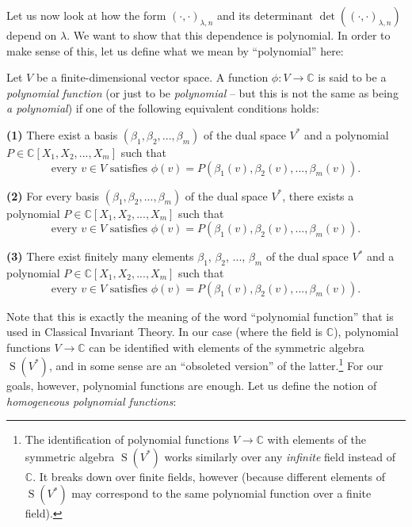 \documentclass[etingof-lie.tex]{subfiles}
\begin{document}
Let us now look at how the form $\left(  \cdot,\cdot\right)  _{\lambda,n}$ and
its determinant $\det\left(  \left(  \cdot,\cdot\right)  _{\lambda,n}\right)
$ depend on $\lambda$. We want to show that this dependence is polynomial. In
order to make sense of this, let us define what we mean by ``polynomial'' here:

\begin{definition}
\label{def.det.US.poly}Let $V$ be a finite-dimensional vector space. A
function $\phi:V\rightarrow\mathbb{C}$ is said to be a \textit{polynomial
function} (or just to be \textit{polynomial} -- but this is not the same as
being \textit{a polynomial}) if one of the following equivalent conditions holds:

\textbf{(1)} There exist a basis $\left(  \beta_{1},\beta_{2},...,\beta
_{m}\right)  $ of the dual space $V^{\ast}$ and a polynomial $P\in
\mathbb{C}\left[  X_{1},X_{2},...,X_{m}\right]  $ such that%
\[
\text{every }v\in V\text{ satisfies }\phi\left(  v\right)  =P\left(  \beta
_{1}\left(  v\right)  ,\beta_{2}\left(  v\right)  ,...,\beta_{m}\left(
v\right)  \right)  .
\]


\textbf{(2)} For every basis $\left(  \beta_{1},\beta_{2},...,\beta
_{m}\right)  $ of the dual space $V^{\ast}$, there exists a polynomial
$P\in\mathbb{C}\left[  X_{1},X_{2},...,X_{m}\right]  $ such that%
\[
\text{every }v\in V\text{ satisfies }\phi\left(  v\right)  =P\left(  \beta
_{1}\left(  v\right)  ,\beta_{2}\left(  v\right)  ,...,\beta_{m}\left(
v\right)  \right)  .
\]


\textbf{(3)} There exist finitely many elements $\beta_{1}$, $\beta_{2}$,
$...$, $\beta_{m}$ of the dual space $V^{\ast}$ and a polynomial
$P\in\mathbb{C}\left[  X_{1},X_{2},...,X_{m}\right]  $ such that%
\[
\text{every }v\in V\text{ satisfies }\phi\left(  v\right)  =P\left(  \beta
_{1}\left(  v\right)  ,\beta_{2}\left(  v\right)  ,...,\beta_{m}\left(
v\right)  \right)  .
\]

\end{definition}

Note that this is exactly the meaning of the word ``polynomial function'' that
is used in Classical Invariant Theory. In our case (where the field is
$\mathbb{C}$), polynomial functions $V\rightarrow\mathbb{C}$ can be identified
with elements of the symmetric algebra $\operatorname*{S}\left(  V^{\ast
}\right)  $, and in some sense are an ``obsoleted version'' of the
latter.\footnote{The identification of polynomial functions $V\rightarrow
\mathbb{C}$ with elements of the symmetric algebra $\operatorname*{S}\left(
V^{\ast}\right)  $ works similarly over any \textit{infinite} field instead of
$\mathbb{C}$. It breaks down over finite fields, however (because different
elements of $\operatorname*{S}\left(  V^{\ast}\right)  $ may correspond to the
same polynomial function over a finite field).} For our goals, however,
polynomial functions are enough. Let us define the notion of
\textit{homogeneous polynomial functions}:
\end{document}
